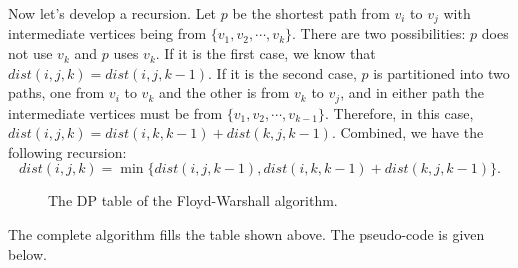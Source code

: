 Now let's develop a recursion.
Let $p$ be the shortest path from $v_i$ to $v_j$ with 
intermediate vertices being from $\{v_1, v_2, \cdots, v_k\}$.
There are two possibilities: $p$ does not use $v_k$ and $p$ uses $v_k$.
If it is the first case, we know that $dist(i,j,k) = dist(i,j,k-1)$.
If it is the second case, $p$ is partitioned into two paths, one from $v_i$ to $v_k$ and the other is from $v_k$ to $v_j$,
and in either path the 
intermediate vertices must be from $\{v_1, v_2, \cdots, v_{k-1}\}$.
Therefore, in this case, $dist(i,j,k) = dist(i,k,k-1) + dist(k,j,k-1)$.
Combined, we have the following recursion:
$$dist(i,j,k) = \min\{dist(i,j,k-1), dist(i,k,k-1) + dist(k,j,k-1)\}.$$

\begin{figure}[h]
\centering{}
\caption{The DP table of the Floyd-Warshall algorithm.}
\label{fig:floyd}
\end{figure}

The complete algorithm fills the table shown above. 
The pseudo-code is given below.

\begin{algorithmblock}[0.8\textwidth]
	\xxx
	\xxx
	\xxx
	\xxx
	\xxx
	\xxx
	\xxx
	\xxx
	\xxx
\end{algorithmblock}



